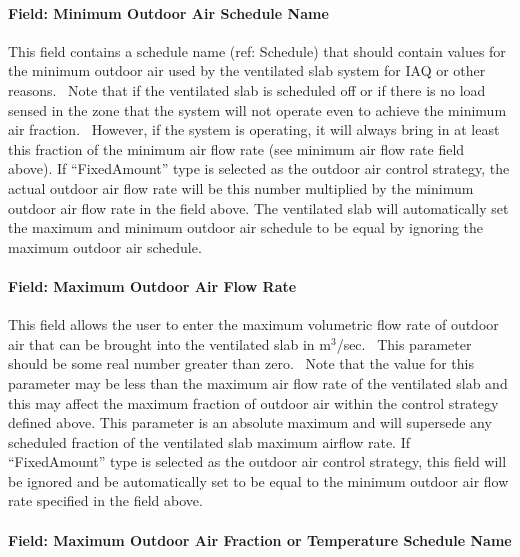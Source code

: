 \paragraph{Field: Minimum Outdoor Air Schedule Name}\label{field-minimum-outdoor-air-schedule-name-001}

This field contains a schedule name (ref: Schedule) that should contain values for the minimum outdoor air used by the ventilated slab system for IAQ or other reasons.~ Note that if the ventilated slab is scheduled off or if there is no load sensed in the zone that the system will not operate even to achieve the minimum air fraction.~ However, if the system is operating, it will always bring in at least this fraction of the minimum air flow rate (see minimum air flow rate field above). If ``FixedAmount'' type is selected as the outdoor air control strategy, the actual outdoor air flow rate will be this number multiplied by the minimum outdoor air flow rate in the field above. The ventilated slab will automatically set the maximum and minimum outdoor air schedule to be equal by ignoring the maximum outdoor air schedule.

\paragraph{Field: Maximum Outdoor Air Flow Rate}\label{field-maximum-outdoor-air-flow-rate-001}

This field allows the user to enter the maximum volumetric flow rate of outdoor air that can be brought into the ventilated slab in m\(^{3}\)/sec.~ This parameter should be some real number greater than zero.~ Note that the value for this parameter may be less than the maximum air flow rate of the ventilated slab and this may affect the maximum fraction of outdoor air within the control strategy defined above. This parameter is an absolute maximum and will supersede any scheduled fraction of the ventilated slab maximum airflow rate. If ``FixedAmount'' type is selected as the outdoor air control strategy, this field will be ignored and be automatically set to be equal to the minimum outdoor air flow rate specified in the field above.

\paragraph{Field: Maximum Outdoor Air Fraction or Temperature Schedule Name}\label{field-maximum-outdoor-air-fraction-or-temperature-schedule-name}


